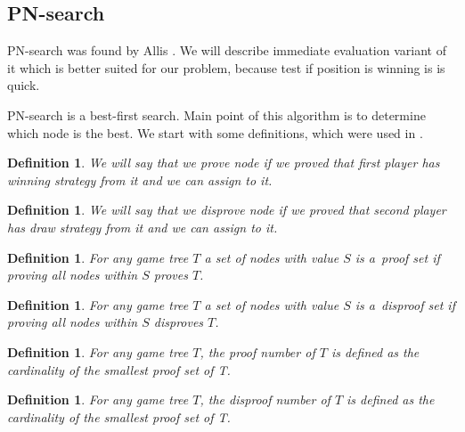 \subsection{PN-search}

PN-search was found by Allis . We will describe immediate evaluation
variant of it which is better suited for our problem, because test if position is winning is
is quick.

PN-search is a best-first search. Main point of this algorithm is to determine
which node is the best. We start with some definitions, which were used in . 

\newtheorem*{prove}{Definition}	
\begin{prove}
We will say that we \emph{prove} node if we proved that first player has winning strategy
from it and we can assign \value{true} to it. 
\end{prove}

\newtheorem*{disprove}{Definition}	
\begin{disprove}
We will say that we \emph{disprove} node if we proved that second player has draw strategy
from it and we can assign \value{false} to it. 
\end{disprove}

\newtheorem*{proofSet}{Definition}	
\begin{proofSet}
	For any game tree $T$ a set of nodes with value \value{unknown} $S$ is a~{\sl proof set}
	if proving all nodes within $S$ proves $T$.
\end{proofSet}

\newtheorem*{disproofSet}{Definition}	
\begin{disproofSet}
	For any game tree $T$ a set of nodes with value \value{unknown} $S$ is a~{\sl disproof set}
	if proving all nodes within $S$ disproves $T$.
\end{disproofSet}

\newtheorem*{proofNumber}{Definition} 
\begin{proofNumber}
	For any game tree $T$, the {\sl proof number} of $T$ is defined as the 
	cardinality of the smallest proof set of T.
\end{proofNumber}

\newtheorem*{disproofNumber}{Definition}	
\begin{disproofNumber}
	For any game tree $T$, the {\sl disproof number} of $T$ is defined as the 
	cardinality of the smallest proof set of T.
\end{disproofNumber}

